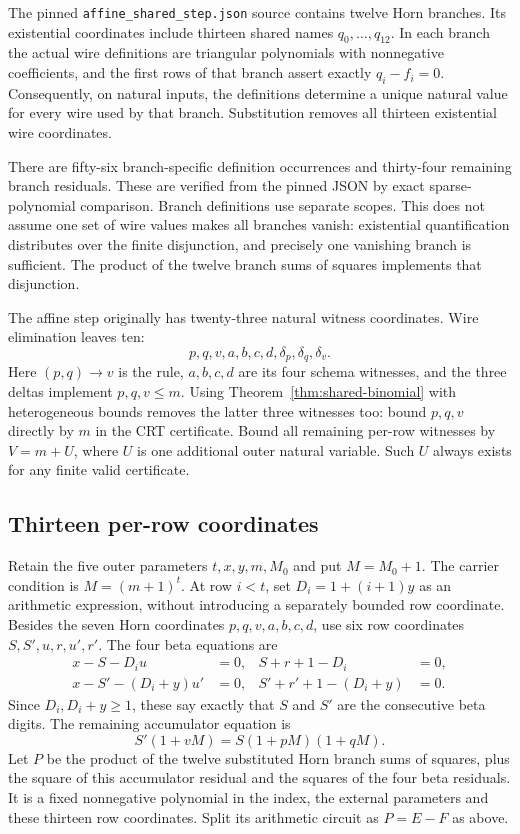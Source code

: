 The pinned \nolinkurl{affine_shared_step.json} source contains twelve Horn
branches.  Its existential coordinates include thirteen shared names
$q_0,\ldots,q_{12}$.  In each branch the actual wire definitions are
triangular polynomials with nonnegative coefficients, and the first rows of
that branch assert exactly $q_i-f_i=0$.  Consequently, on natural inputs,
the definitions determine a unique natural value for every wire used by that
branch.  Substitution removes all thirteen existential wire coordinates.

There are fifty-six branch-specific definition occurrences and thirty-four
remaining branch residuals.  These are verified from the pinned JSON by exact
sparse-polynomial comparison.  Branch definitions use separate scopes.  This
does not assume one set of wire values makes all branches vanish: existential
quantification distributes over the finite disjunction, and precisely one
vanishing branch is sufficient.  The product of the twelve branch sums of
squares implements that disjunction.

The affine step originally has twenty-three natural witness coordinates.
Wire elimination leaves ten:
\[
 p,q,v,a,b,c,d,\delta_p,\delta_q,\delta_v.
\]
Here $(p,q)\to v$ is the rule, $a,b,c,d$ are its four schema witnesses,
and the three deltas implement $p,q,v\le m$.
Using Theorem~\ref{thm:shared-binomial} with heterogeneous bounds removes
the latter three witnesses too: bound $p,q,v$ directly by $m$ in the CRT
certificate.  Bound all remaining per-row witnesses by $V=m+U$, where
$U$ is one additional outer natural variable.  Such $U$ always exists for
any finite valid certificate.

\subsection{Thirteen per-row coordinates}

Retain the five outer parameters $t,x,y,m,M_0$ and put $M=M_0+1$.
The carrier condition is $M=(m+1)^t$.  At row $i<t$, set
$D_i=1+(i+1)y$ as an arithmetic expression, without introducing a
separately bounded row coordinate.  Besides the seven Horn coordinates
$p,q,v,a,b,c,d$, use six row coordinates $S,S',u,r,u',r'$.
The four beta equations are
\begin{align*}
 x-S-D_i u&=0,& S+r+1-D_i&=0,\\
 x-S'-(D_i+y)u'&=0,& S'+r'+1-(D_i+y)&=0.
\end{align*}
Since $D_i,D_i+y\ge1$, these say exactly that $S$ and $S'$ are
the consecutive beta digits.  The remaining accumulator equation is
\[
 S'(1+vM)=S(1+pM)(1+qM).
\]
Let $P$ be the product of the twelve substituted Horn branch sums of squares,
plus the square of this accumulator residual and the squares of the four
beta residuals.  It is a fixed nonnegative polynomial in the index,
the external parameters and these thirteen row coordinates.  Split its
arithmetic circuit as $P=E-F$ as above.

